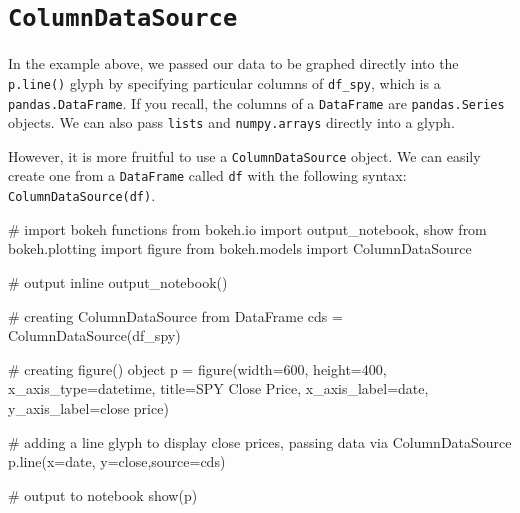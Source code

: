 \documentclass[
  letterpaper,
  DIV=11,
  numbers=noendperiod]{scrreprt}
\newenvironment{Shaded}{\begin{snugshade}}{\end{snugshade}}
\newcommand{\CommentTok}[1]{\textcolor[rgb]{0.37,0.37,0.37}{#1}}
\newcommand{\DecValTok}[1]{\textcolor[rgb]{0.68,0.00,0.00}{#1}}
\newcommand{\ImportTok}[1]{\textcolor[rgb]{0.00,0.46,0.62}{#1}}
\newcommand{\NormalTok}[1]{\textcolor[rgb]{0.00,0.23,0.31}{#1}}
\newcommand{\OperatorTok}[1]{\textcolor[rgb]{0.37,0.37,0.37}{#1}}
\newcommand{\StringTok}[1]{\textcolor[rgb]{0.13,0.47,0.30}{#1}}
\begin{document}
\hypertarget{columndatasource}{%
\section{\texorpdfstring{\texttt{ColumnDataSource}}{ColumnDataSource}}\label{columndatasource}}

In the example above, we passed our data to be graphed directly into the
\texttt{p.line()} glyph by specifying particular columns of
\texttt{df\_spy}, which is a \texttt{pandas.DataFrame}. If you recall,
the columns of a \texttt{DataFrame} are \texttt{pandas.Series} objects.
We can also pass \texttt{lists} and \texttt{numpy.arrays} directly into
a glyph.

However, it is more fruitful to use a \texttt{ColumnDataSource} object.
We can easily create one from a \texttt{DataFrame} called \texttt{df}
with the following syntax: \texttt{ColumnDataSource(df)}.

\begin{Shaded}
\begin{Highlighting}[]
\CommentTok{\# import bokeh functions}
\ImportTok{from}\NormalTok{ bokeh.io }\ImportTok{import}\NormalTok{ output\_notebook, show}
\ImportTok{from}\NormalTok{ bokeh.plotting }\ImportTok{import}\NormalTok{ figure}
\ImportTok{from}\NormalTok{ bokeh.models }\ImportTok{import}\NormalTok{ ColumnDataSource}

\CommentTok{\# output inline}
\NormalTok{output\_notebook()}

\CommentTok{\# creating ColumnDataSource from DataFrame}
\NormalTok{cds }\OperatorTok{=}\NormalTok{ ColumnDataSource(df\_spy)}

\CommentTok{\# creating figure() object}
\NormalTok{p }\OperatorTok{=}\NormalTok{ figure(width}\OperatorTok{=}\DecValTok{600}\NormalTok{, height}\OperatorTok{=}\DecValTok{400}\NormalTok{, x\_axis\_type}\OperatorTok{=}\StringTok{\textquotesingle{}datetime\textquotesingle{}}\NormalTok{, title}\OperatorTok{=}\StringTok{\textquotesingle{}SPY Close Price\textquotesingle{}}\NormalTok{,}
\NormalTok{           x\_axis\_label}\OperatorTok{=}\StringTok{\textquotesingle{}date\textquotesingle{}}\NormalTok{, y\_axis\_label}\OperatorTok{=}\StringTok{\textquotesingle{}close price\textquotesingle{}}\NormalTok{)}

\CommentTok{\# adding a line glyph to display close prices, passing data via ColumnDataSource}
\NormalTok{p.line(x}\OperatorTok{=}\StringTok{\textquotesingle{}date\textquotesingle{}}\NormalTok{, y}\OperatorTok{=}\StringTok{\textquotesingle{}close\textquotesingle{}}\NormalTok{,source}\OperatorTok{=}\NormalTok{cds)}

\CommentTok{\# output to notebook}
\NormalTok{show(p)}
\end{Highlighting}
\end{Shaded}
\end{document}
